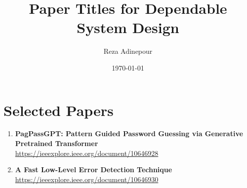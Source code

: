 \documentclass{article}
\begin{document}
	
	\title{Paper Titles for Dependable System Design}
	\author{Reza Adinepour}
	\date{\today}
	
	\maketitle
	
	\section*{Selected Papers}
	
	\begin{enumerate}
		\item \textbf{PagPassGPT: Pattern Guided Password Guessing via Generative Pretrained Transformer} \\
		\href{https://ieeexplore.ieee.org/document/10646928}{https://ieeexplore.ieee.org/document/10646928}
		
		\item \textbf{A Fast Low-Level Error Detection Technique} \\
		\href{https://ieeexplore.ieee.org/document/10646930}{https://ieeexplore.ieee.org/document/10646930}
	\end{enumerate}
	
\end{document}
